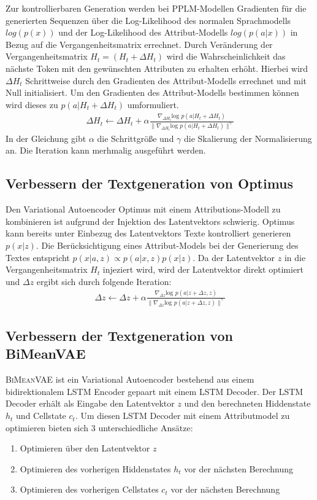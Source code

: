 Zur kontrollierbaren Generation werden bei PPLM-Modellen Gradienten für die generierten Sequenzen über die Log-Likelihood des normalen Sprachmodells $log(p(x))$ und der Log-Likelihood des Attribut-Modells $log(p(a|x))$ in Bezug auf die Vergangenheitsmatrix errechnet. 
Durch Veränderung der Vergangenheitsmatrix $H_t = (H_t+\Delta H_t)$ wird die Wahrscheinlichkeit das nächste Token mit den gewünschten Attributen zu erhalten erhöht. Hierbei wird $\Delta H_t$ Schrittweise durch den Gradienten des Attribut-Modells errechnet und mit Null initialisiert.
Um den Gradienten des Attribut-Modells bestimmen können wird dieses zu $p(a|H_t+\Delta H_t)$ umformuliert.
\begin{align*}
\Delta H_t \leftarrow \Delta H_t + \alpha \frac{\nabla_{\Delta H_t} \text{log }p(a|H_t+\Delta H_t)}{\| \nabla_{\Delta H_t} \text{log }p(a|H_t+\Delta H_t)\|^\gamma}
\end{align*}
In der Gleichung gibt $\alpha$ die Schrittgröße und $\gamma$ die Skalierung der Normalisierung an. Die Iteration kann merhmalig ausgeführt werden.

\subsection{Verbessern der Textgeneration von Optimus}
Den Variational Autoencoder Optimus mit einem Attributions-Modell zu kombinieren ist aufgrund der Injektion des Latentvektors schwierig.
Optimus kann bereits unter Einbezug des Latentvektors Texte kontrolliert generieren $p(x|z)$.
Die Berücksichtigung eines Attribut-Models bei der Generierung des Textes entspricht $p(x|a,z) \propto p(a|x,z)p(x|z)$.%
Da der Latentvektor $z$ in die Vergangenheitsmatrix $H_t$ injeziert wird, wird der Latentvektor direkt optimiert und $\Delta z$ ergibt sich durch folgende Iteration:
\begin{align*}
    \Delta z \leftarrow \Delta z + \alpha \frac{\nabla_{\Delta z} \text{log }p(a|z+\Delta z,z)}{\| \nabla_{\Delta z} \text{log }p(a|z+\Delta z,z)\|^\gamma}
\end{align*}



\subsection{Verbessern der Textgeneration von BiMeanVAE}
\textsc{BiMeanVAE} ist ein Variational Autoencoder bestehend aus einem bidirektionalem LSTM Encoder gepaart mit einem LSTM Decoder.
Der LSTM Decoder erhält als Eingabe den Latentvektor $z$ und den berechneten Hiddenstate $h_t$ und Cellstate $c_t$.
Um diesen LSTM Decoder mit einem Attributmodel zu optimieren bieten sich 3 unterschiedliche Ansätze:
\begin{enumerate}
    \item Optimieren über den Latentvektor $z$
    \item Optimieren des vorherigen Hiddenstates $h_t$ vor der nächsten Berechnung
    \item Optimieren des vorherigen Cellstates $c_t$ vor der nächsten Berechnung
\end{enumerate}

